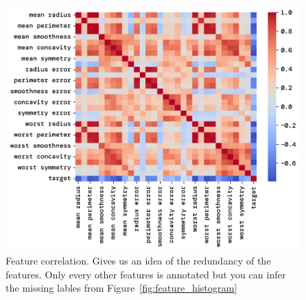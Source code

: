 \documentclass[twoside,11pt]{report}
\begin{document}
\begin{figure}
    \begin{center}
        \includegraphics[width=\textwidth]{../runsAndFigures/feature_correlation.png}
    \end{center}
    \caption{Feature correlation. Gives us an idea of the redundancy of the features.
        Only every other features is annotated but you can infer the missing lables 
    from Figure~\ref{fig:feature_histogram}}\label{fig:feature_correlation}
\end{figure}
\end{document}
